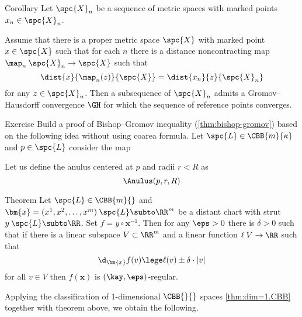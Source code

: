 \begin{thm}{Corollary}
Let $\spc{X}_n$ be a sequence of metric spaces
with marked points $x_n\in  \spc{X}_n$.

Assume that there is a proper metric space $\spc{X}$ with marked point $x\in \spc{X}$
such that for each $n$ there is a distance noncontracting map 
$\map_n\:\spc{X}_n\to \spc{X}$ 
such that 
$$\dist{x}{\map_n(z)}{\spc{X}}
=
\dist{x_n}{z}{\spc{X}_n}$$
for any $z\in \spc{X}_n$.
Then a subsequence of $\spc{X}_n$ admits a Gromov--Hausdorff convergence $\GH$
for which the sequence of reference points converges.
\end{thm}
















\begin{thm}{Exercise}
Build a proof of Bishop--Gromov inequality (\ref{thm:bishop-gromov}) based on the following idea without using coarea formula.
Let $\spc{L}\in \CBB{m}{\kappa}$ and $p\in\spc{L}$
consider the map 

Let us define the anulus centered at $p$ and radii $r<R$
as
\[\Anulus(p,r,R)\]

\end{thm}

















\begin{thm}{Theorem}\label{thm:reg-point-stable}
Let $\spc{L}\in\CBB{m}{}$
and $\bm{x}=(x^1,x^2,\dots,x^m)\:\spc{L}\subto\RR^m$ be a distant chart with strut $y\:\spc{L}\subto\RR$.
Set $f=y\circ\bm{x}^{-1}$.  
Then for any $\eps>0$ there is $\delta>0$ such that
if there is a linear subspace $V\subset \RR^m$ 
and a linear function $\ell\:V\to\RR$
such that
\[\d_{\bm{x}}f(v)\lege\ell(v)\pm\delta\cdot|v|\]
for all $v\in V$ 
then $f(\bm{x})$ is $(\kay,\eps)$-regular.
\end{thm}

Applying 
the classification of 1-dimensional $\CBB{}{}$ spaces \ref{thm:dim=1.CBB}
together with theorem above,
we obtain the following.

